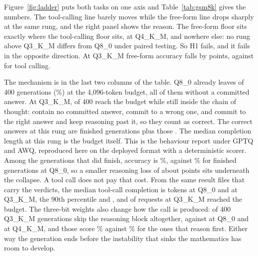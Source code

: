 \documentclass[12pt,letterpaper]{article}
\begin{document}
Figure~\ref{fig:ladder} puts both tasks on one axis and Table~\ref{tab:gsm8k} gives the numbers. The tool-calling line barely moves while the free-form line drops sharply at the same rung, and the right panel shows the reason. The free-form floor sits exactly where the tool-calling floor sits, at Q4\_K\_M, and nowhere else: no rung above Q3\_K\_M differs from Q8\_0 under paired testing. So H1 fails, and it fails in the opposite direction. At Q3\_K\_M free-form accuracy falls by \qtGsmDropThree{} points, against \qtDropThree{} for tool calling.

The mechanism is in the last two columns of the table. Q8\_0 already leaves \qtGsmTruncEight{} of 400 generations (\qtGsmTruncPctEight{}\%) at the 4{,}096-token budget, all of them without a committed answer. At Q3\_K\_M, \qtGsmTruncThree{} of 400 reach the budget while still inside the chain of thought: \qtGsmTruncNoAnswerThree{} contain no committed answer, \qtGsmTruncWrongThree{} commit to a wrong one, and \qtGsmTruncCorrectThree{} commit to the right answer and keep reasoning past it, so they count as correct. The \qtGsmCorrectThree{} correct answers at this rung are \qtGsmFinishedCorrectThree{} finished generations plus those \qtGsmTruncCorrectThree{}. The median completion length at this rung is the budget itself. This is the behaviour \citet{lotfi2026overthink} report under GPTQ and AWQ, reproduced here on the deployed format with a deterministic scorer. Among the \qtGsmFinishedNThree{} generations that did finish, accuracy is \qtGsmFinishedAccThree{}\%, against \qtGsmFinishedAccEight{}\% for finished generations at Q8\_0, so a smaller reasoning loss of about \qtGsmFinishedDrop{} points sits underneath the collapse. A tool call does not pay that cost. From the same result files that carry the verdicts, the median tool-call completion is \qtToolNgenMedEight{} tokens at Q8\_0 and \qtToolNgenMedThree{} at Q3\_K\_M, the 90th percentile \qtToolNgenPninezeroEight{} and \qtToolNgenPninezeroThree{}, and \qtToolNgenCapThree{} of \qtToolNgenReqsThree{} requests at Q3\_K\_M reached the budget. The three-bit weights also change how the call is produced: \qtToolNoReasonThree{} of 400 Q3\_K\_M generations skip the reasoning block altogether, against \qtToolNoReasonEight{} at Q8\_0 and \qtToolNoReasonFour{} at Q4\_K\_M, and those score \qtToolNoReasonAccThree{}\% against \qtToolReasonAccThree{}\% for the ones that reason first. Either way the generation ends before the instability that sinks the mathematics has room to develop.
\end{document}
